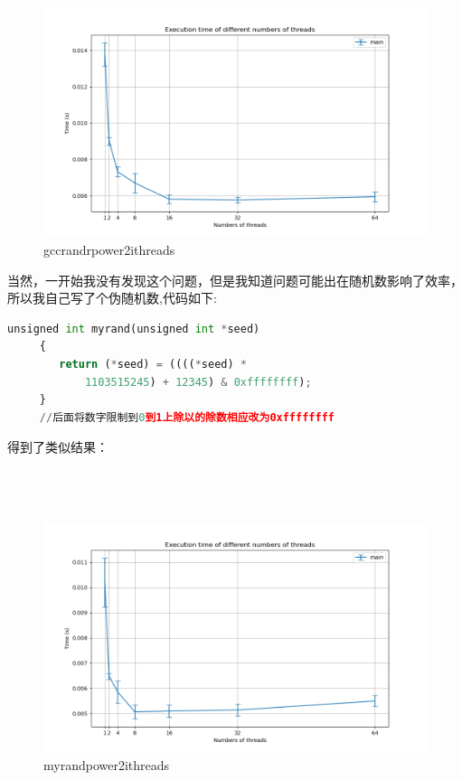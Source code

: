 \documentclass{LabReport}
\begin{document}
\begin{figure}[h!]
	\centering
	\includegraphics[width=1\linewidth]{figures/GccRandr_power(2,i)threads}
	\caption{gccrandrpower2ithreads}
	\label{fig:gccrandrpower2ithreads}
\end{figure}

	当然，一开始我没有发现这个问题，但是我知道问题可能出在随机数影响了效率，所以我自己写了个伪随机数,代码如下:
	
	\begin{lstlisting}[language=python,frame=shadowbox]
unsigned int myrand(unsigned int *seed)
	 {
		return (*seed) = ((((*seed) * 
			1103515245) + 12345) & 0xffffffff);
	 }
	 //后面将数字限制到0到1上除以的除数相应改为0xffffffff
	\end{lstlisting}
	
	得到了类似结果：\\\\\\\\
	
\begin{figure}[h!]
	\centering
	\includegraphics[width=0.8\linewidth]{figures/MyRand_power(2,i)threads_1008000points}
	\caption{myrandpower2ithreads}
	\label{fig:myrandpower2ithreads}
\end{figure}
\end{document}
